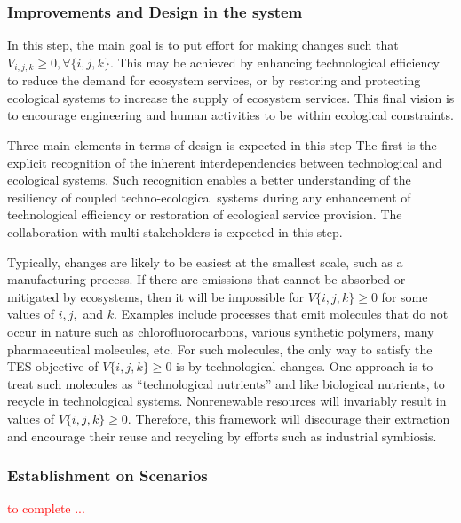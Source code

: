 \documentclass[
  14pt,
]{extarticle}
\begin{document}
\hypertarget{improvements-and-design-in-the-system}{%
\subsubsection{Improvements and Design in the system}\label{improvements-and-design-in-the-system}}

In this step, the main goal is to put effort for making changes such that \(V_{i,j,k} \geq 0, \forall\{i,j,k\}\).
This may be achieved by enhancing technological efficiency to reduce the demand for ecosystem services, or by restoring and protecting ecological systems to increase the supply of ecosystem services.
This final vision is to encourage engineering and human activities to be within ecological constraints.

Three main elements in terms of design is expected in this step
The first is the explicit recognition of the inherent interdependencies between technological and ecological systems.
Such recognition enables a better understanding of the resiliency of coupled techno-ecological systems during any enhancement of technological efficiency or restoration of ecological service provision.
The collaboration with multi-stakeholders is expected in this step.

Typically, changes are likely to be easiest at the smallest scale, such as a manufacturing process.
If there are emissions that cannot be absorbed or mitigated by ecosystems, then it will be impossible for \(V\{i,j,k\} \geq 0\) for some values of \(i, j,\) and \(k\).
Examples include processes that emit molecules that do not occur in nature such as chlorofluorocarbons, various synthetic polymers, many pharmaceutical molecules, etc.
For such molecules, the only way to satisfy the TES objective of \(V\{i,j,k\} \geq 0\) is by technological changes.
One approach is to treat such molecules as ``technological nutrients'' and like biological nutrients, to recycle in technological systems.
Nonrenewable resources will invariably result in values of \(V\{i,j,k\} \geq 0\).
Therefore, this framework will discourage their extraction and encourage their reuse and recycling by efforts such as industrial symbiosis.

\hypertarget{establishment-on-scenarios}{%
\subsubsection{Establishment on Scenarios}\label{establishment-on-scenarios}}

\textcolor{red}{to complete ... }
\end{document}
